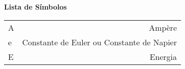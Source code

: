 \thispagestyle{empty}
\Huge
\textbf{Lista de Símbolos}
\normalsize
\vspace{1cm}

\begin{longtable}{lr}
A&\dotfill     Ampère\\
e&\dotfill      Constante de Euler ou Constante de Napier\\
E&\dotfill      Energia
\end{longtable}
